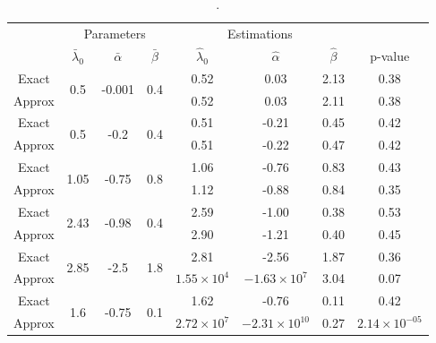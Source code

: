 \begin{table}[!ht]
\centering
\begin{tabular}{cccc|ccc|c}
\hline
    & \multicolumn{3}{c}{Parameters} & \multicolumn{3}{c}{Estimations} & \\
   & $\bar \lambda_0$ &  $\bar \alpha$ &  $\bar \beta$ & $\hat \lambda_0$ &  $\hat \alpha$ &  $\hat \beta$ &  p-value \\
\hline
       Exact&\multirow{2}{*}{0.5 } & \multirow{2}{*}{-0.001 } & \multirow{2}{*}{0.4} &       0.52 & 0.03 & 2.13 & 0.38\\
       Approx&      &       &       & 0.52 & 0.03 & 2.11 & 0.38\\ \hline
       Exact&\multirow{2}{*}{0.5 } & \multirow{2}{*}{-0.2 } & \multirow{2}{*}{0.4 } &       0.51 & -0.21 & 0.45  & 0.42    \\
       Approx&      &       &       &0.51 & -0.22 & 0.47 & 0.42\\ \hline
       Exact&\multirow{2}{*}{1.05 } & \multirow{2}{*}{-0.75 } & \multirow{2}{*}{0.8 } &       1.06 & -0.76 & 0.83 & 0.43  \\
       Approx&      &       &       &1.12 & -0.88 & 0.84 & 0.35\\ \hline
       Exact&\multirow{2}{*}{2.43 } & \multirow{2}{*}{-0.98 } & \multirow{2}{*}{0.4} &       2.59 & -1.00 & 0.38 & 0.53  \\
       Approx&      &       &       & 2.90 & -1.21 & 0.40 & 0.45 \\ \hline
       Exact&\multirow{2}{*}{2.85 } & \multirow{2}{*}{-2.5 } & \multirow{2}{*}{1.8} &       2.81 & -2.56 & 1.87 & 0.36\\
       Approx&      &       &       &$1.55\times10^{4}$ & $-1.63\times10^{7}$ & 3.04  & 0.07\\ \hline
       Exact&\multirow{2}{*}{1.6 } & \multirow{2}{*}{-0.75 } & \multirow{2}{*}{0.1} &       1.62 & -0.76 & 0.11 & 0.42   \\
       Approx&      &       &       &$2.72\times10^{7} $& $-2.31\times10^{10}$  & 0.27  & $2.14\times10^{-05}$\\
\hline
\end{tabular}
\caption{
.
}
\label{table:chap2_estim_pvalue}
\end{table}

